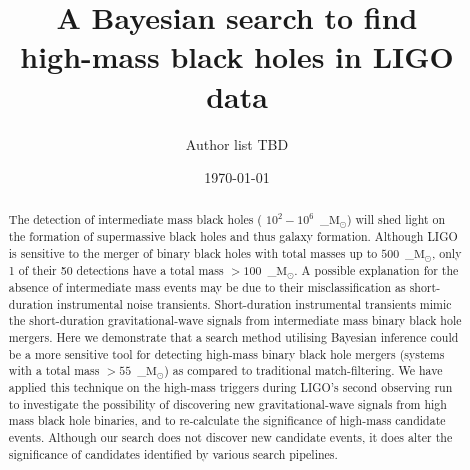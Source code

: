 \documentclass[%
 amsmath,amssymb,
 aps,
twocolumn
]{revtex4}
\newcommand{\mathcmd}[1]{{\sc \relax\ifmmode#1\else $#1$\fi}\xspace}
\newcommand{\msun}{\mathcmd{\text{M}_\odot}}
\begin{document}
\preprint{\textcolor[rgb]{0.00,0.50,0.75}{{}}}

\title{A Bayesian search to find \\high-mass black holes in LIGO data}


\author{Author list TBD}

\date{\today}

\begin{abstract}

The detection of intermediate mass black holes ( $10^2-10^6$~\msun) will shed light on the formation of supermassive black holes and thus galaxy formation. Although LIGO is sensitive to the merger of binary black holes with total masses up to $500$~\msun, only 1 of their 50 detections have a total mass $>100$~\msun. A possible explanation for the absence of intermediate mass events may be due to their misclassification as short-duration instrumental noise transients. Short-duration instrumental transients mimic the short-duration gravitational-wave signals from intermediate mass binary black hole mergers. Here we demonstrate that a search method utilising Bayesian inference could be a more sensitive tool for detecting high-mass binary black hole mergers (systems with a total mass $>55$~\msun) as compared to traditional match-filtering. We have applied this technique on the high-mass triggers during LIGO's second observing run to investigate the possibility of discovering new gravitational-wave signals from high mass black hole binaries, and to re-calculate the significance of high-mass candidate events. Although our search does not discover new candidate events, it does alter the significance of candidates identified by various search pipelines. 



\end{abstract}

\maketitle


\end{document}
